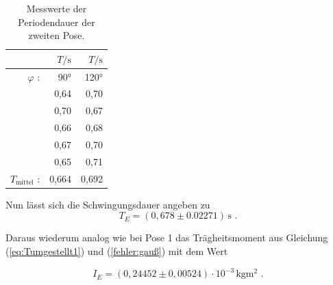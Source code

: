 \begin{table}
  \centering
  \caption{Messwerte der Periodendauer der zweiten Pose.}
  \label{tab:PeriodendauerPose2}
  \begin{tabular}{rrr}
    \toprule
    & $T / \unit\second$ &  $T / \unit\second$  \\
    \midrule
    $\varphi$ : & 90° & 120° \\
    \midrule
          & 0,64 &        0,70 \\
          & 0,70 &        0,67 \\
          & 0,66 &        0,68 \\
          & 0,67 &        0,70 \\
          & 0,65 &        0,71 \\
    \midrule
    $T_{\text{mittel}}$ : & 0,664 & 0,692 \\
    \bottomrule
    \end{tabular}
\end{table}

Nun lässt sich die Schwingungsdauer angeben zu
\begin{equation*}
  T_E = (0,678 \pm 0.02271) \, \unit\second \text{ .}
\end{equation*}

Daraus wiederum analog wie bei Pose 1 das Trägheitsmoment aus Gleichung (\ref{eq:Tumgestellt1}) und (\ref{fehler:gauß}) mit dem Wert

\begin{equation*}
  I_E = (0,24452 \pm 0,00524)  \cdot 10^{-3} %
  \, \unit{\kilo\gram\meter\squared} \text{ .}
\end{equation*}